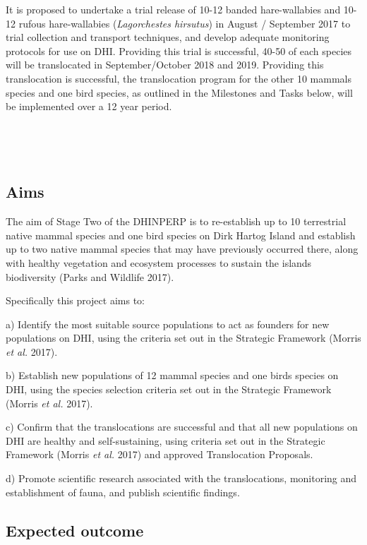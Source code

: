 \documentclass[version=last,
    paper=a4,                               %
    10pt,                                   %
    dvipsnames,
    oneside,                              %
    headings=openany,                       %
    open=any,
    BCOR=7mm,                               %
    DIV=15,     %
]{scrbook}
\begin{document}
It is proposed to undertake a trial release of 10-12 banded
hare-wallabies and 10-12 rufous hare-wallabies (\emph{Lagorchestes
hirsutus}) in August / September 2017 to trial collection and transport
techniques, and develop adequate monitoring protocols for use on DHI.
Providing this trial is successful, 40-50 of each species will be
translocated in September/October 2018 and 2019. Providing this
translocation is successful, the translocation program for the other 10
mammals species and one bird species, as outlined in the Milestones and
Tasks below, will be implemented over a 12 year period.

~

~




\subsection*{Aims}

The aim of Stage Two of the DHINPERP is to re-establish up to 10
terrestrial native mammal species and one bird species on Dirk Hartog
Island and establish up to two native mammal species that may have
previously occurred there, along with healthy vegetation and ecosystem
processes to sustain the islands biodiversity (Parks and Wildlife 2017).

Specifically this project aims to:

a) Identify the most suitable source populations to act as founders for
new populations on DHI, using the criteria set out in the Strategic
Framework (Morris \emph{et al.} 2017).

b) Establish new populations of 12 mammal species and one birds species
on DHI, using the species selection criteria set out in the Strategic
Framework (Morris \emph{et al.} 2017).

c) Confirm that the translocations are successful and that all new
populations on DHI are healthy and self-sustaining, using criteria set
out in the Strategic Framework (Morris \emph{et al.} 2017) and approved
Translocation Proposals.

d) Promote scientific research associated with the translocations,
monitoring and establishment of fauna, and publish scientific findings.




\subsection*{Expected outcome}
\end{document}
